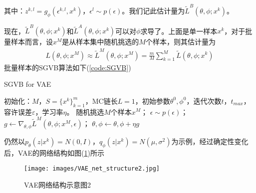             其中：$z^{k,l} = g_\phi(\epsilon^{k,l},x^k)$，$\epsilon^l\sim p(\epsilon)$。我们记此估计量为$\tilde{L}^B(\theta,\phi;x^k)$。
            \par
            现在，$\tilde{L}^B(\theta,\phi;x^k)$和$\tilde{L}^A(\theta,\phi;x^k)$可以对$\phi$求导了。上面是单一样本$x^k$，对于批量样本而言，设$x^M$是从样本集中随机挑选的$M$个样本，则其估计量为
            \begin{align*}
            L(\theta,\phi;x^M) \approx \tilde{L}^M(\theta,\phi;x^M) = \frac{m}{M} \sum_{k=1}^M \tilde{L}(\theta,\phi;x^k)
            \end{align*}
            批量样本的SGVB算法如下(\ref{code:SGVB})
            \begin{algorithm}[htbp]
                \caption{SGVB for VAE}\label{code:SGVB}
                \begin{algorithmic}[1]
                    \State 初始化：$M$，$S = \{x^k\}_{k=1}^m$，MC链长$L =1$，初始参数$\theta^0,\phi^0$，迭代次数$t$，$t_{max}$，容许误差$\varepsilon$，学习率$\eta $。
                        \State 随机挑选$M$个样本$x^M$；
                        \State $\epsilon \sim p(\epsilon)$；
                        \State $g \gets \nabla_{\theta,\phi}\tilde{L}^M(\theta,\phi;x^M,\epsilon)$；
                        \State $\theta,\phi \gets \theta,\phi + \eta g$
                    \EndWhile
                \end{algorithmic}
            \end{algorithm}
            \par
            仍然以$p_\theta(z|x^k) = N(0,I)$，$q_\phi(z|x^k)= N(\mu,\sigma^2)$为示例，经过确定性变化后，VAE的网络结构如图(\ref{fig:VAE网络结构示意图2})所示
            \begin{figure}[H]
            \centering
            \texttt{[image: images/VAE\_net\_structure2.jpg]}
            \caption{VAE网络结构示意图2}
            \label{fig:VAE网络结构示意图2}
            \end{figure}

